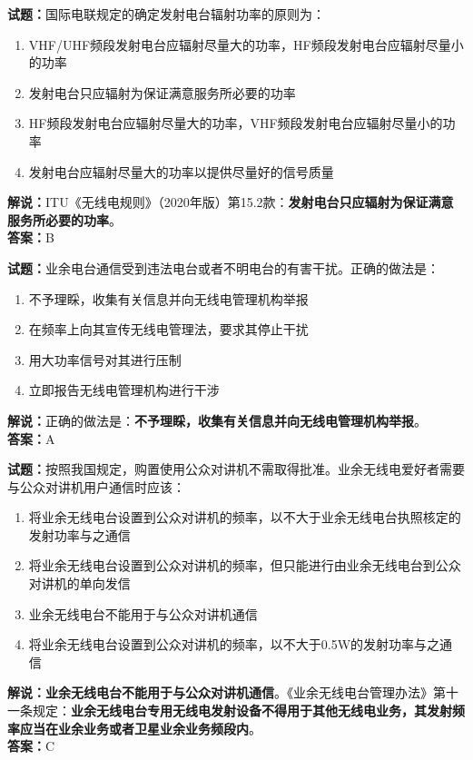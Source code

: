 \documentclass{ctexbook}
\begin{document}
\vspace{1em}

\textbf{试题：}国际电联规定的确定发射电台辐射功率的原则为：
\begin{enumerate}[leftmargin=3em]
  \item VHF/UHF频段发射电台应辐射尽量大的功率，HF频段发射电台应辐射尽量小的功率
  \item 发射电台只应辐射为保证满意服务所必要的功率
  \item HF频段发射电台应辐射尽量大的功率，VHF频段发射电台应辐射尽量小的功率
  \item 发射电台应辐射尽量大的功率以提供尽量好的信号质量
\end{enumerate}
\noindent\textbf{解说：}ITU《无线电规则》（2020年版）第15.2款：\textbf{发射电台只应辐射为保证满意服务所必要的功率}。\\\noindent\textbf{答案：}B

\vspace{1em}

\textbf{试题：}业余电台通信受到违法电台或者不明电台的有害干扰。正确的做法是：
\begin{enumerate}[leftmargin=3em]
  \item 不予理睬，收集有关信息并向无线电管理机构举报
  \item 在频率上向其宣传无线电管理法，要求其停止干扰
  \item 用大功率信号对其进行压制
  \item 立即报告无线电管理机构进行干涉
\end{enumerate}
\noindent\textbf{解说：}正确的做法是：\textbf{不予理睬，收集有关信息并向无线电管理机构举报}。\\\noindent\textbf{答案：}A

\vspace{1em}

\textbf{试题：}按照我国规定，购置使用公众对讲机不需取得批准。业余无线电爱好者需要与公众对讲机用户通信时应该：
\begin{enumerate}[leftmargin=3em]
  \item 将业余无线电台设置到公众对讲机的频率，以不大于业余无线电台执照核定的发射功率与之通信
  \item 将业余无线电台设置到公众对讲机的频率，但只能进行由业余无线电台到公众对讲机的单向发信
  \item 业余无线电台不能用于与公众对讲机通信
  \item 将业余无线电台设置到公众对讲机的频率，以不大于0.5W的发射功率与之通信
\end{enumerate}
\noindent\textbf{解说：}\textbf{业余无线电台不能用于与公众对讲机通信}。《业余无线电台管理办法》第十一条规定：\textbf{业余无线电台专用无线电发射设备不得用于其他无线电业务，其发射频率应当在业余业务或者卫星业余业务频段内}。\\\noindent\textbf{答案：}C
\end{document}
